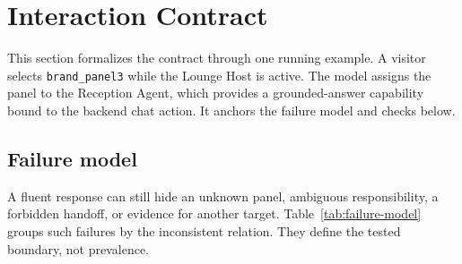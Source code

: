\section{Interaction Contract}
\label{sec:contract}

This section formalizes the contract through one running example.  A visitor
selects \texttt{brand\_panel3} while the Lounge Host is active.  The model
assigns the panel to the Reception Agent, which provides a grounded-answer
capability bound to the backend chat action.  It anchors the failure model and
checks below.

\subsection{Failure model}

A fluent response can still hide an unknown panel, ambiguous responsibility,
a forbidden handoff, or evidence for another target.  Table~\ref{tab:failure-model}
groups such failures by the inconsistent relation.  They define the tested
boundary, not prevalence.

